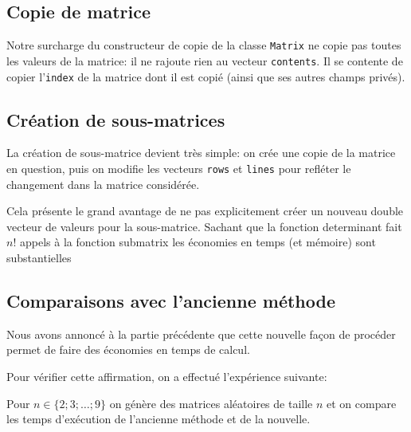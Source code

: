\documentclass[a4paper,11pt]{article}
\begin{document}
\subsection{Copie de matrice}

Notre surcharge du constructeur de copie de la classe \texttt{Matrix}  ne copie pas toutes les valeurs de la matrice: il ne rajoute rien au vecteur \texttt{contents}. Il se contente de copier l'\texttt{index} de la matrice dont il est copié (ainsi que ses autres champs privés).

\subsection{Création de sous-matrices}

La création de sous-matrice devient très simple: on crée une copie de la matrice en question, puis on modifie les vecteurs \texttt{rows} et \texttt{lines} pour refléter le changement dans la matrice considérée.

Cela présente le grand avantage de ne pas explicitement créer un nouveau double vecteur de valeurs pour la sous-matrice. Sachant que la fonction determinant fait $n!$ appels à la fonction submatrix les économies en temps (et mémoire) sont substantielles


\subsection{Comparaisons avec l'ancienne méthode}

Nous avons annoncé à la partie précédente que cette nouvelle façon de procéder permet de faire des économies en temps de calcul.

Pour vérifier cette affirmation, on a effectué l'expérience suivante:

Pour $n \in \{2;3;\dots;9\}$ on génère des matrices aléatoires de taille $n$ et on compare les temps d'exécution de l'ancienne méthode et de la nouvelle.
\end{document}

